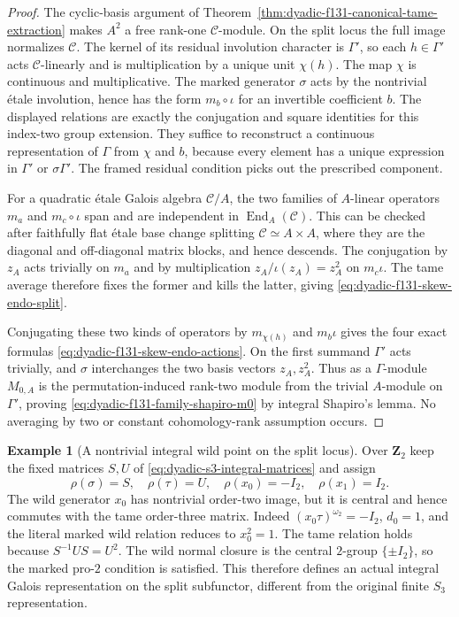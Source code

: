\documentclass[11pt]{article}
\theoremstyle{definition}
\newtheorem{example}[theorem]{Example}
\begin{document}
\begin{proof}
The cyclic-basis
argument of
Theorem~\ref{thm:dyadic-f131-canonical-tame-extraction}
makes $A^2$ a free
rank-one $\mathcal C$-module.
On the split locus
the full image
normalizes $\mathcal C$.
The kernel of its
residual involution
character is
$\Gamma'$, so
each $h\in\Gamma'$
acts $\mathcal C$-linearly
and is multiplication
by a unique unit
$\chi(h)$.  The map
$\chi$ is continuous
and multiplicative.
The marked generator
$\sigma$ acts by the
nontrivial étale
involution, hence
has the form
$m_b\circ\iota$
for an invertible
coefficient $b$.
The displayed
relations are exactly
the conjugation
and square identities
for this index-two
group extension.
They suffice to
reconstruct a continuous
representation of
$\Gamma$ from
$\chi$ and $b$,
because every element
has a unique
expression in
$\Gamma'$ or
$\sigma\Gamma'$.
The framed residual
condition picks out
the prescribed
component.

For a quadratic
étale Galois
algebra $\mathcal C/A$,
the two families
of $A$-linear
operators $m_a$
and $m_c\circ\iota$
span and are
independent in
$\operatorname{End}_A(\mathcal C)$.
This can be checked
after faithfully
flat étale base
change splitting
$\mathcal C\simeq A\times A$,
where they are
the diagonal and
off-diagonal
matrix blocks,
and hence descends.
The conjugation
by $z_A$ acts
trivially on
$m_a$ and by
multiplication
$z_A/\iota(z_A)=z_A^2$
on $m_c\iota$.
The tame average
therefore fixes
the former and
kills the latter,
giving
\eqref{eq:dyadic-f131-skew-endo-split}.

Conjugating these
two kinds of
operators by
$m_{\chi(h)}$
and $m_b\iota$
gives the four
exact formulas
\eqref{eq:dyadic-f131-skew-endo-actions}.
On the first
summand $\Gamma'$
acts trivially,
and $\sigma$
interchanges the
two basis vectors
$z_A,z_A^2$.
Thus as a
$\Gamma$-module
$M_{0,A}$ is the
permutation-induced
rank-two module
from the trivial
$A$-module on
$\Gamma'$, proving
\eqref{eq:dyadic-f131-family-shapiro-m0}
by integral
Shapiro's lemma.
No averaging by
two or constant
cohomology-rank
assumption occurs.
\end{proof}

\begin{example}[A nontrivial integral wild point on the split locus]
\label{ex:dyadic-f131-nontrivial-split-wild-point}
Over $\mathbf Z_2$ keep
the fixed matrices
$S,U$ of
\eqref{eq:dyadic-s3-integral-matrices}
and assign
\[
\rho(\sigma)=S,\quad
\rho(\tau)=U,\quad
\rho(x_0)=-I_2,\quad
\rho(x_1)=I_2.
\]
The wild generator
$x_0$ has nontrivial
order-two image,
but it is central
and hence commutes
with the tame
order-three matrix.
Indeed
$(x_0\tau)^{\omega_2}=-I_2$,
$d_0=1$, and the
literal marked
wild relation
reduces to
$x_0^2=1$.
The tame relation
holds because
$S^{-1}US=U^2$.
The wild normal
closure is the
central $2$-group
$\{\pm I_2\}$,
so the marked
pro-$2$ condition
is satisfied.
This therefore
defines an
actual integral
Galois representation
on the split
subfunctor, different
from the original
finite $S_3$
representation.
\end{example}
\end{document}
